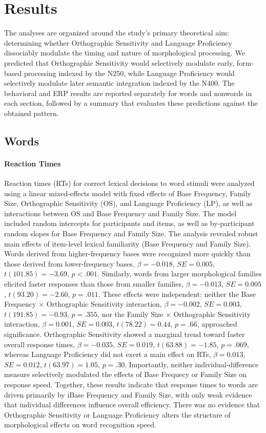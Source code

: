 \section{Results}

The analyses are organized around the study's primary theoretical aim: determining whether Orthographic Sensitivity and Language Proficiency dissociably modulate the timing and nature of morphological processing. We predicted that Orthographic Sensitivity would selectively modulate early, form-based processing indexed by the N250, while Language Proficiency would selectively modulate later semantic integration indexed by the N400. The behavioral and ERP results are reported separately for words and nonwords in each section, followed by a summary that evaluates these predictions against the obtained pattern.

\subsection{Words}

\paragraph*{Reaction Times }
Reaction times (RTs) for correct lexical decisions to word stimuli were analyzed using a linear mixed-effects model with fixed effects of Base Frequency, Family Size, Orthographic Sensitivity (OS), and Language Proficiency (LP), as well as interactions between OS and Base Frequency and Family Size. The model included random intercepts for participants and items, as well as by-participant random slopes for Base Frequency and Family Size. The analysis revealed robust main effects of item-level lexical familiarity (Base Frequency and Family Size). Words derived from higher-frequency bases were recognized more quickly than those derived from lower-frequency bases, $\beta = -0.018$, $SE = 0.005$, $t(101.85) = -3.69$, $p < .001$. Similarly, words from larger morphological families elicited faster responses than those from smaller families, $\beta = -0.013$, $SE = 0.005$, $t(93.20) = -2.60$, $p = .011$. These effects were independent: neither the Base Frequency × Orthographic Sensitivity interaction, $\beta = -0.002$, $SE = 0.003$, $t(191.85) = -0.93$, $p = .355$, nor the Family Size × Orthographic Sensitivity interaction, $\beta = 0.001$, $SE = 0.003$, $t(78.22) = 0.44$, $p = .66$, approached significance. Orthographic Sensitivity showed a marginal trend toward faster overall response times, $\beta = -0.035$, $SE = 0.019$, $t(63.88) = -1.85$, $p = .069$, whereas Language Proficiency did not exert a main effect on RTs, $\beta = 0.013$, $SE = 0.012$, $t(63.97) = 1.05$, $p = .30$. Importantly, neither individual-difference measure selectively modulated the effects of Base Frequecy or Family Size on response speed. Together, these results indicate that response times to words are driven primarily by iBase Frequency and Family Size, with only weak evidence that individual differences influence overall efficiency. There was no evidence that Orthographic Sensitivity or Language Proficiency alters the structure of morphological effects on word recognition speed.

